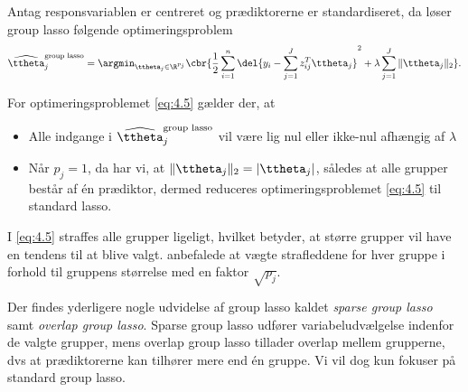\begin{defn}[Group lasso]
Antag responsvariablen er centreret og prædiktorerne er standardiseret, da løser group lasso følgende optimeringsproblem
\begin{align}
\widehat{\ttheta}_j^{\text{group lasso}} = \argmin_{\ttheta_j \in \R^{p_j}} \cbr{\frac{1}{2} \sum_{i=1}^n \del{y_i - \sum_{j=1}^J z_{ij}^T \ttheta_j}^2 + \lambda \sum_{j=1}^J \Vert \ttheta_j \Vert_2}. \label{eq:4.5}
\end{align}
\end{defn}
For optimeringsproblemet \eqref{eq:4.5} gælder der, at
\begin{itemize}
\item Alle indgange i $\widehat{\ttheta}_j^\text{group lasso}$ vil være lig nul eller ikke-nul afhængig af \(\lambda\)
\item Når $p_j=1$, da har vi, at $\Vert \ttheta_j \Vert_2 = \vert \ttheta_j \vert$, således at alle grupper består af én prædiktor, dermed reduceres optimeringsproblemet \eqref{eq:4.5} til standard lasso.
\end{itemize}
%
I \eqref{eq:4.5} straffes alle grupper ligeligt, hvilket betyder, at større grupper vil have en tendens til at blive valgt.
\citep{group_lasso} anbefalede at vægte strafleddene for hver gruppe i forhold til gruppens størrelse med en faktor \(\sqrt{p_j}\).

Der findes yderligere nogle udvidelse af group lasso kaldet \textit{sparse group lasso} samt \textit{overlap group lasso}.
Sparse group lasso udfører variabeludvælgelse indenfor de valgte grupper, mens overlap group lasso tillader overlap mellem grupperne, dvs at prædiktorerne kan tilhører mere end én gruppe.
Vi vil dog kun fokuser på standard group lasso.

